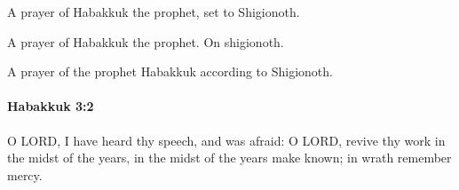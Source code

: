 			\begin{versebox}
					\item[BHS] 
					\item[LXX] 
					\item[ASV] A prayer of Habakkuk the prophet, set to Shigionoth.
					\item[NIV] A prayer of Habakkuk the prophet. On shigionoth.
					\item[NRSV] A prayer of the prophet Habakkuk according to Shigionoth.
			\end{versebox}

		\paragraph{Habakkuk 3:2} %
			\label{HABAKKUK-3-2}

			O LORD, I have heard thy speech, and was afraid: O LORD, revive thy work in the midst of the years, in the midst of the years make known; in wrath remember mercy.

